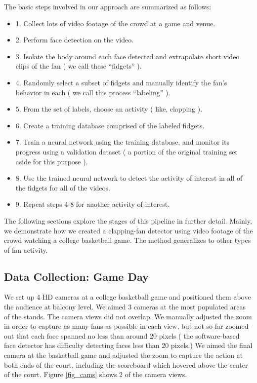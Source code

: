 \documentclass[times, 10pt,twocolumn]{article}
\begin{document}
The basic steps involved in our approach are summarized as follows:

\begin{itemize}
\item 1. Collect lots of video footage of the crowd at a game and venue.
\item 2. Perform face detection on the video.
\item 3. Isolate the body around each face detected and extrapolate short video clips of the fan ( we call these ``fidgets'' ).
\item 4. Randomly select a subset of fidgets and manually identify the fan’s behavior in each ( we call this process ``labeling'' ).
\item 5. From the set of labels, choose an activity ( like, clapping ).
\item 6. Create a training database comprised of the labeled fidgets.
\item 7. Train a neural network using the training database, and monitor its progress using a validation dataset ( a portion of the original training set aside for this purpose ).
\item 8.  Use the trained neural network to detect the activity of interest in all of the fidgets for all of the videos.
\item 9.  Repeat steps 4-8 for another activity of interest.
\end{itemize}

The following sections explore the stages of this pipeline in further detail.  Mainly, we demonstrate how we created a clapping-fan detector using video footage of the crowd watching a college basketball game.  The method generalizes to other types of fan activity.

\subsection{Data Collection: Game Day}
\label{sec_GameDay}

We set up 4 HD cameras at a college basketball game and positioned them above the audience at balcony level.  We aimed 3 cameras at the most populated areas of the stands.  The camera views did not overlap.  We manually adjusted the zoom in order to capture as many fans as possible in each view, but not so far zoomed-out that each face spanned no less than around 20 pixels ( the software-based face detector has difficulty detecting faces less than 20 pixels.)  We aimed the final camera at the basketball game and adjusted the zoom to capture the action at both ends of the court, including the scoreboard which hovered above the center of the court.  Figure \ref{fig_cams} shows 2 of the camera views.
\end{document}
